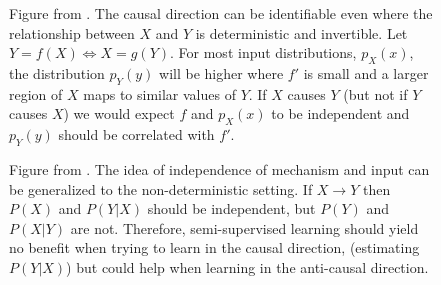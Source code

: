 \documentclass[20pt]{extreport}
\begin{document}
\begin{figure}
\centering
\caption{Figure from {\cite{Daniusis2010}}. The causal direction can be identifiable even where the relationship between $X$ and $Y$ is deterministic and invertible. Let $Y = f(X) \Leftrightarrow X = g(Y)$. For most input distributions, $p_{X}(x)$, the distribution $p_{Y}(y)$ will be higher where $f'$ is small and a larger region of $X$ maps to similar values of $Y$. If $X$ causes $Y$ (but not if $Y$ causes $X$) we would expect $f$ and $p_{X}(x)$ to be independent and $p_{Y}(y)$ should be correlated with $f'$.} 

{}
\end{figure}

\begin{figure}
\centering
\caption{Figure from {\cite{Scholkopf2012}}. The idea of independence of mechanism and input can be generalized to the non-deterministic setting. If $X \rightarrow Y$ then $P(X)$ and $P(Y|X)$ should be independent, but $P(Y)$ and $P(X|Y)$ are not. Therefore, semi-supervised learning should yield no benefit when trying to learn in the causal direction, (estimating $P(Y|X)$) but could help when learning in the anti-causal direction.}
{}
\end{figure}
\end{document}
